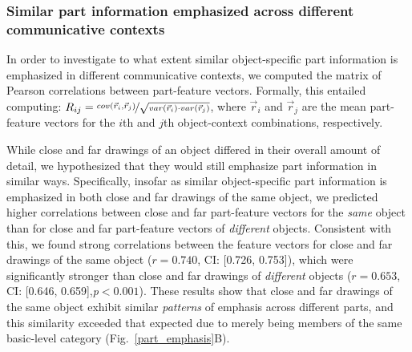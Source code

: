 \documentclass[10pt,letterpaper]{article}
\begin{document}
\subsubsection{Similar part information emphasized across different communicative contexts}

In order to investigate to what extent similar object-specific part information is emphasized in different communicative contexts, we computed the matrix of Pearson correlations between part-feature vectors. 
Formally, this entailed computing: $R_{ij} =  \nicefrac{cov(\vec{r}_{i}, \vec{r}_{j})}{\sqrt{var(\vec{r}_{i}) \cdot var(\vec{r}_{j})}}$, where $\vec{r}_{i}$ and $\vec{r}_{j}$ are the mean part-feature vectors for the $i$th and $j$th object-context combinations, respectively.

While close and far drawings of an object differed in their overall amount of detail, we hypothesized that they would still emphasize part information in similar ways.
Specifically, insofar as similar object-specific part information is emphasized in both close and far drawings of the same object, we predicted higher correlations between close and far part-feature vectors for the \textit{same} object than for close and far part-feature vectors of \textit{different} objects. 
Consistent with this, we found strong correlations between the feature vectors for close and far drawings of the same object ($r = 0.740$,  CI: [0.726, 0.753]), which were significantly stronger than close and far drawings of \emph{different} objects ($r = 0.653$, CI: [0.646, 0.659],\textit{p}$<0.001$).
These results show that close and far drawings of the same object exhibit similar \emph{patterns} of emphasis across different parts, and this similarity exceeded that expected due to merely being members of the same basic-level category (Fig.~\ref{part_emphasis}B). 



\end{document}
